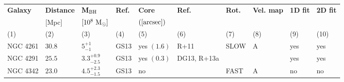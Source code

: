 \begin{table*}                                        
\begin{center}                                        
\begin{tabular}{llllllllll}                           
\hline                                                
\multicolumn{1}{l}{{\bf Galaxy}} &                   
\multicolumn{1}{l}{{\bf Distance}} &                 
\multicolumn{1}{l}{{\bf $\mathbf{M_{\rm BH}}$}} &  
\multicolumn{1}{l}{{\bf Ref.}} &                     
\multicolumn{1}{l}{{\bf Core}} &                     
\multicolumn{1}{l}{{\bf Ref.}} &                     
\multicolumn{1}{l}{{\bf Rot.}} &                     
\multicolumn{1}{l}{{\bf Vel. map}} &                 
\multicolumn{1}{l}{{\bf 1D fit}} &                   
\multicolumn{1}{l}{{\bf 2D fit}} \\                
\multicolumn{1}{l}{} &                                
\multicolumn{1}{l}{[Mpc]} &                           
\multicolumn{1}{l}{$[10^8~\rm M_{\odot}]$} &         
\multicolumn{1}{l}{} &                                
\multicolumn{1}{l}{$([\rm arcsec])$} &                                
\multicolumn{1}{l}{} &                                
\multicolumn{1}{l}{} &                                
\multicolumn{1}{l}{} &                                
\multicolumn{1}{l}{} &                                
\multicolumn{1}{l}{} \\                             
\multicolumn{1}{l}{(1)} &                             
\multicolumn{1}{l}{(2)} &                             
\multicolumn{1}{l}{(3)} &                             
\multicolumn{1}{l}{(4)} &                             
\multicolumn{1}{l}{(5)} &                             
\multicolumn{1}{l}{(6)} &                             
\multicolumn{1}{l}{(7)} &                             
\multicolumn{1}{l}{(8)} &                             
\multicolumn{1}{l}{(9)} &                             
\multicolumn{1}{l}{(10)} \\                         
\hline                                                
NGC 4261  &  $30.8$  &  $5_{-1}^{+1}$   &  GS13  &  yes  $(1.6)$  &  R+11  &   SLOW  &  A  &  yes  &  yes  \\ 
NGC 4291  &  $25.5$  &  $3.3_{-2.5}^{+0.9}$   &  GS13  &  yes  $(0.3)$  &  DG13, R+13a  &      &     &  yes  &  yes  \\ 
NGC 4342  &  $23.0$  &  $4.5_{-1.5}^{+2.3}$   &  GS13  &  no   &     &  FAST   &  A  &  no  &  no  \\ 

\end{tabular}
\end{center}
\end{table*}
